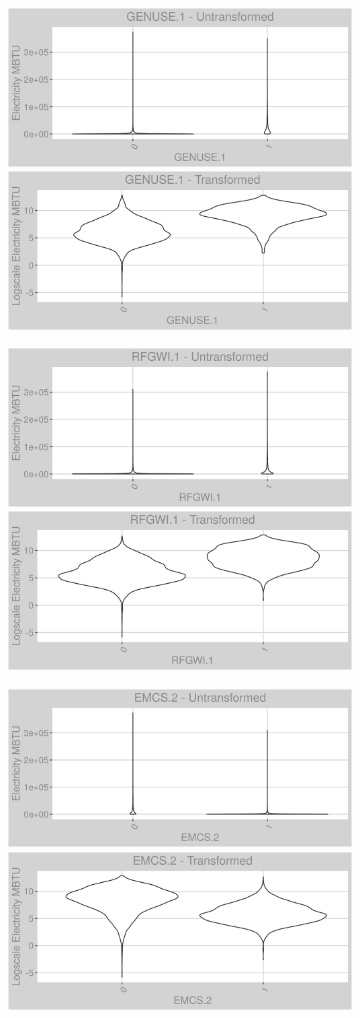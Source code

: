 \newpage
\begin{figure}
\centering
\begin{subfigure}{1\textwidth}
\centering
\includegraphics[width=.49\textwidth, height=0.3\textheight]{Images/electricity_var_original_8.png}
\includegraphics[width=.49\textwidth, height=0.3\textheight]{Images/electricity_var_transformed_8.png}
\end{subfigure}
\begin{subfigure}{1\textwidth}
\centering
\includegraphics[width=.49\textwidth, height=0.3\textheight]{Images/electricity_var_original_9.png}
\includegraphics[width=.49\textwidth, height=0.3\textheight]{Images/electricity_var_transformed_9.png}
\end{subfigure}
\begin{subfigure}{1\textwidth}
\centering
\includegraphics[width=.49\textwidth, height=0.3\textheight]{Images/electricity_var_original_10.png}
\includegraphics[width=.49\textwidth, height=0.3\textheight]{Images/electricity_var_transformed_10.png}
\end{subfigure}
\end{figure}
